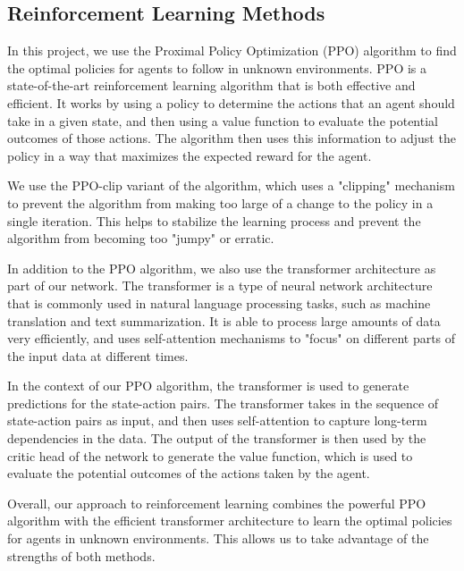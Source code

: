 \subsection{Reinforcement Learning Methods}
\label{subsec:reinf-learning-methods}


In this project, we use the Proximal Policy Optimization (PPO) algorithm \cite{schulman2017proximal} to find the optimal policies for agents to follow in unknown environments. PPO is a state-of-the-art reinforcement learning algorithm that is both effective and efficient. It works by using a policy to determine the actions that an agent should take in a given state, and then using a value function to evaluate the potential outcomes of those actions. The algorithm then uses this information to adjust the policy in a way that maximizes the expected reward for the agent.

We use the PPO-clip variant of the algorithm, which uses a "clipping" mechanism to prevent the algorithm from making too large of a change to the policy in a single iteration. This helps to stabilize the learning process and prevent the algorithm from becoming too "jumpy" or erratic.

In addition to the PPO algorithm, we also use the transformer architecture \cite{attentionisallyouneed} as part of our network. The transformer is a type of neural network architecture that is commonly used in natural language processing tasks, such as machine translation and text summarization. It is able to process large amounts of data very efficiently, and uses self-attention mechanisms to "focus" on different parts of the input data at different times.

In the context of our PPO algorithm, the transformer is used to generate predictions for the state-action pairs. The transformer takes in the sequence of state-action pairs as input, and then uses self-attention to capture long-term dependencies in the data. The output of the transformer is then used by the critic head of the network to generate the value function, which is used to evaluate the potential outcomes of the actions taken by the agent.

Overall, our approach to reinforcement learning combines the powerful PPO algorithm with the efficient transformer architecture to learn the optimal policies for agents in unknown environments. This allows us to take advantage of the strengths of both methods.

